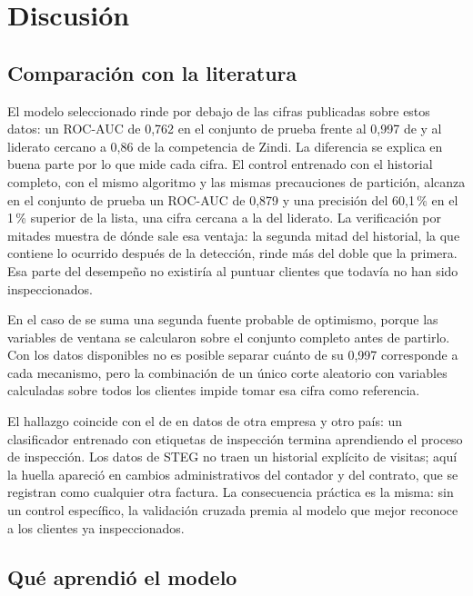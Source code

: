 \section{Discusión}\label{sec:discusion}

\subsection{Comparación con la literatura}

El modelo seleccionado rinde por debajo de las cifras publicadas sobre estos datos: un
ROC-AUC de 0,762 en el conjunto de prueba frente al 0,997 de \textcite{oprea2022} y al
liderato cercano a 0,86 de la competencia de Zindi. La diferencia se explica en buena parte
por lo que mide cada cifra. El control entrenado con el historial completo, con el mismo
algoritmo y las mismas precauciones de partición, alcanza en el conjunto de prueba un ROC-AUC
de 0,879 y una precisión del 60,1\,\% en el 1\,\% superior de la lista, una cifra cercana a
la del liderato. La verificación por mitades muestra de dónde sale esa ventaja: la
segunda mitad del historial, la que contiene lo ocurrido después de la detección, rinde más
del doble que la primera. Esa parte del desempeño no existiría al puntuar clientes que
todavía no han sido inspeccionados.

En el caso de \textcite{oprea2022} se suma una segunda fuente probable de optimismo, porque
las variables de ventana se calcularon sobre el conjunto completo antes de partirlo. Con los
datos disponibles no es posible separar cuánto de su 0,997 corresponde a cada mecanismo,
pero la combinación de un único corte aleatorio con variables calculadas sobre todos los
clientes impide tomar esa cifra como referencia.

El hallazgo coincide con el de \textcite{comapuig2022} en datos de otra empresa y otro país:
un clasificador entrenado con etiquetas de inspección termina aprendiendo el proceso de
inspección. Los datos de STEG no traen un historial explícito de visitas; aquí la huella
apareció en cambios administrativos del contador y del contrato, que se registran como
cualquier otra factura. La consecuencia práctica es la misma: sin un control específico,
la validación cruzada premia al modelo que mejor reconoce a los clientes ya inspeccionados.

\subsection{Qué aprendió el modelo}

